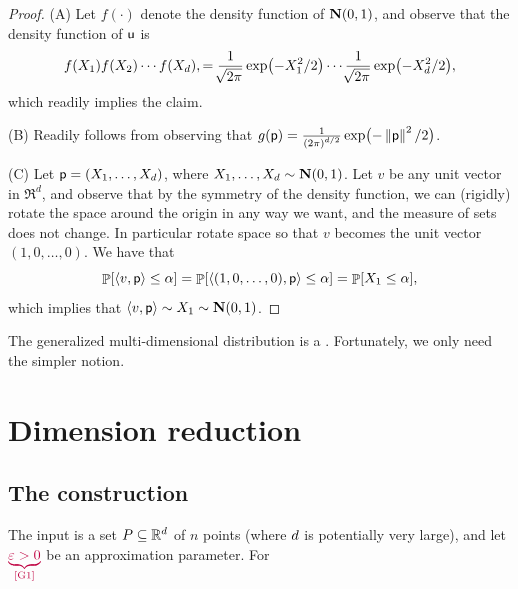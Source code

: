 \begin{proof}
    (A) Let $f(\cdot)$ denote the density function of
    $\NormalY{0}{1}$, and observe that the density function of $\mathsf{u}$ is
    \begin{equation*}
        f(X_1) f(X_2) \cdots f(X_\hdim),
        = %
        \frac{1}{\mysqrt{2\pi}} \exp \pth{ -X_1^2/2}
        \cdots
        \frac{1}{\mysqrt{2\pi}} \exp \pth{ -X_\hdim^2/2},
    \end{equation*}
    which readily implies the claim.

    
    (B) Readily follows from observing that
    $g(\pnt)=\frac{1}{\pth{2\pi}^{\hdim/2} } \exp\bigl( -
    \norm{\pnt}^2/2\bigr)$. 

    (C) Let $\mathsf{p} = (X_1, \ldots, X_d)$, where
    $X_1,\ldots, X_d \sim \NormalY{0}{1}$.  Let $v$ be any unit vector
    in $\Re^d$, and observe that by the symmetry of the density
    function, we can (rigidly) rotate the space around the origin in
    any way we want, and the measure of sets does not change. In
    particular rotate space so that $v$ becomes the unit vector
    $(1,0,\ldots, 0)$. We have that
    \begin{equation*}
        \Prob{ \DotProd{v}{\pnt} \leq \alpha}%
        =%
        \Prob{ \DotProd{(1, 0, \ldots, 0)}{\pnt} \leq \alpha}%
        =%
        \Prob{ X_1 \leq \alpha},
    \end{equation*}
    which implies that
    $\DotProd{v}{\pnt} \sim X_1 \sim \NormalY{0}{1}$. 
\end{proof}

The generalized multi-dimensional distribution is a
. Fortunately, we only need the simpler notion.



\section{Dimension reduction}

\subsection{The construction}

The input is a set $P \subseteq \mathbb{R}^d$ of $n$ points (where
$d$ is potentially very large), and let $\markX{G1}{\eps >0}$ be an
approximation parameter.
For

